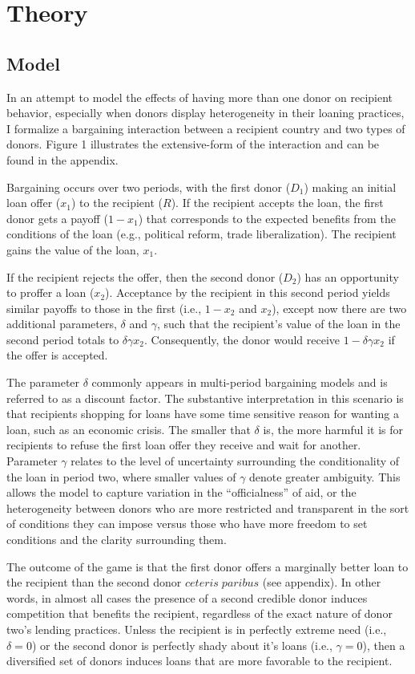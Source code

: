 \section*{Theory}
\subsection*{Model}
In an attempt to model the effects of having more than one donor on recipient behavior, especially when donors display heterogeneity in their loaning practices, I formalize a bargaining interaction between a recipient country and two types of donors. Figure 1 illustrates the extensive-form of the interaction and can be found in the appendix.  

Bargaining occurs over two periods, with the first donor ($D_1$) making an initial loan offer ($x_1$) to the recipient ($R$). If the recipient accepts the loan, the first donor gets a payoff ($1-x_1$) that corresponds to the expected benefits from the conditions of the loan (e.g., political reform, trade liberalization). The recipient gains the value of the loan, $x_1$.

If the recipient rejects the offer, then the second donor ($D_2$) has an opportunity to proffer a loan ($x_2$). Acceptance by the recipient in this second period yields similar payoffs to those in the first (i.e., $1-x_2$ and $x_2$), except now there are two additional parameters, $\delta$ and $\gamma$, such that the recipient's value of the loan in the second period totals to $\delta \gamma x_2$. Consequently, the donor would receive $1-\delta \gamma x_2$ if the offer is accepted.

The parameter $\delta$ commonly appears in multi-period bargaining models and is referred to as a discount factor. The substantive interpretation in this scenario is that recipients shopping for loans have some time sensitive reason for wanting a loan, such as an economic crisis. The smaller that $\delta$ is, the more harmful it is for recipients to refuse the first loan offer they receive and wait for another. Parameter $\gamma$ relates to the level of uncertainty surrounding the conditionality of the loan in period two, where smaller values of $\gamma$ denote greater ambiguity. This allows the model to capture variation in the ``officialness'' of aid, or the heterogeneity between donors who are more restricted and transparent in the sort of conditions they can impose versus those who have more freedom to set conditions and the clarity surrounding them.

The outcome of the game is that the first donor offers a marginally better loan to the recipient than the second donor $ceteris\;paribus$ (see appendix). In other words, in almost all cases the presence of a second credible donor induces competition that benefits the recipient, regardless of the exact nature of donor two's lending practices. Unless the recipient is in perfectly extreme need (i.e., $\delta=0$) or the second donor is perfectly shady about it's loans (i.e., $\gamma=0$), then a diversified set of donors induces loans that are more favorable to the recipient.

